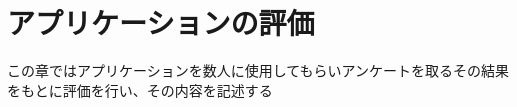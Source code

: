 \documentclass[main]{subfiles}
\begin{document}
\chapter{アプリケーションの評価}
\label{cha:validation}
この章ではアプリケーションを数人に使用してもらいアンケートを取るその結果をもとに評価を行い、その内容を記述する
\end{document}

